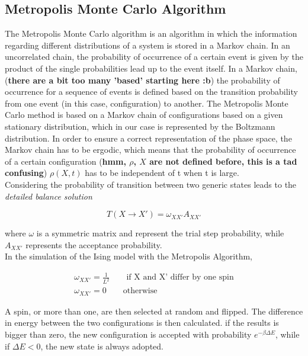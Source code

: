 \documentclass[twoside]{article}
\begin{document}
\begin{multicols}{2}
\subsection{Metropolis Monte Carlo Algorithm}
The Metropolis Monte Carlo algorithm is an algorithm in which the information regarding different distributions of a system is stored in a Markov chain. 
In an uncorrelated chain, the probability of occurrence of a certain event is given by the product of the single probabilities lead up to the event itself. In a Markov chain, (\textbf{there are a bit too many 'based' starting here :b}) the probability of occurrence for a sequence of events is defined based on the transition probability from one event (in this case, configuration) to another.
The Metropolis Monte Carlo method is based on a Markov chain of configurations based on a given stationary distribution, which in our case is represented by the Boltzmann distribution. In order to ensure a correct representation of the phase space, the Markov chain has to be ergodic, which means that the probability of occurrence of a certain configuration  (\textbf{hmm, $\rho$, $X$ are not defined before, this is a tad confusing}) $\rho(X, t)$ has to be independent of t when t is large. \\
Considering the probability of transition between two generic states leads to the \emph{detailed balance solution}

\begin{equation}
T(X \rightarrow X') = \omega_{XX'}A_{XX'}
\end{equation}

where \textbf{$\omega$} is a symmetric matrix and represent the trial step probability, while $A_{XX'}$ represents the acceptance probability. \\
In the simulation of the Ising model with the Metropolis Algorithm, 

\begin{align}
\omega_{XX'} = \frac{1}{L^2} \qquad \text{if X and X' differ by one spin} \\
\omega_{XX'} = 0 \qquad  \text{otherwise} 
\end{align}

A spin, or more than one, are then selected at random and flipped. The difference in energy between the two configurations is then calculated. if the results is bigger than zero, the new configuration is accepted with probability $e^{-\beta\Delta E}$, while if $\Delta E < 0$, the new state is always adopted.


\end{multicols}
\end{document}
